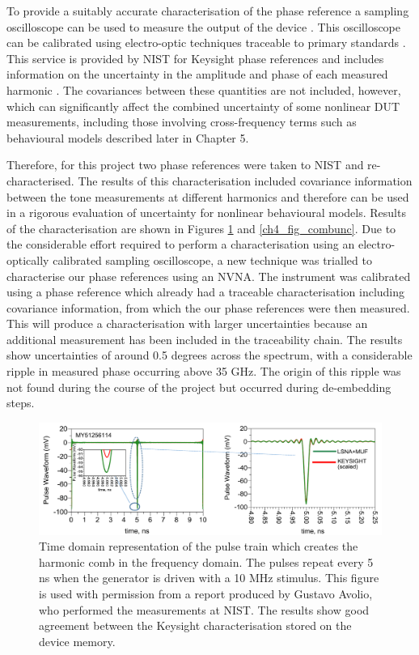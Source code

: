 \documentclass[../thesis/thesis.tex]{subfiles}
\begin{document}
\begin{refsection}
To provide a suitably accurate characterisation of the phase reference a sampling oscilloscope can be used to measure the output of the device \cite{Reader_2008}. This oscilloscope can be calibrated using electro-optic techniques traceable to primary standards \cite{Williams_2006, Hale_2009}. This service is provided by NIST for Keysight phase references and includes information on the uncertainty in the amplitude and phase of each measured harmonic \cite{Keysight_2017}. The covariances between these quantities are not included, however, which can significantly affect the combined uncertainty of some nonlinear DUT measurements, including those involving cross-frequency terms such as behavioural models described later in Chapter 5.

Therefore, for this project two phase references were taken to NIST and re-characterised. The results of this characterisation included covariance information between the tone measurements at different harmonics and therefore can be used in a rigorous evaluation of uncertainty for nonlinear behavioural models. Results of the characterisation are shown in Figures \ref{ch4_fig_comb} and \ref{ch4_fig_combunc}. Due to the considerable effort required to perform a characterisation using an electro-optically calibrated sampling oscilloscope, a new technique was trialled to characterise our phase references using an NVNA. The instrument was calibrated using a phase reference which already had a traceable characterisation including covariance information, from which the our phase references were then measured. This will produce a characterisation with larger uncertainties because an additional measurement has been included in the traceability chain. The results show uncertainties of around 0.5 degrees across the spectrum, with a considerable ripple in measured phase occurring above 35 GHz. The origin of this ripple was not found during the course of the project but occurred during de-embedding steps.

\begin{figure}
	\centering
	\includegraphics[width=\textwidth]{comb.png}
	\caption{Time domain representation of the pulse train which creates the harmonic comb in the frequency domain. The pulses repeat every 5 ns when the generator is driven with a 10 MHz stimulus. This figure is used with permission from a report produced by Gustavo Avolio, who performed the measurements at NIST. The results show good agreement between the Keysight characterisation stored on the device memory.}
	\label{ch4_fig_comb}
\end{figure}


\end{refsection}
\end{document}
